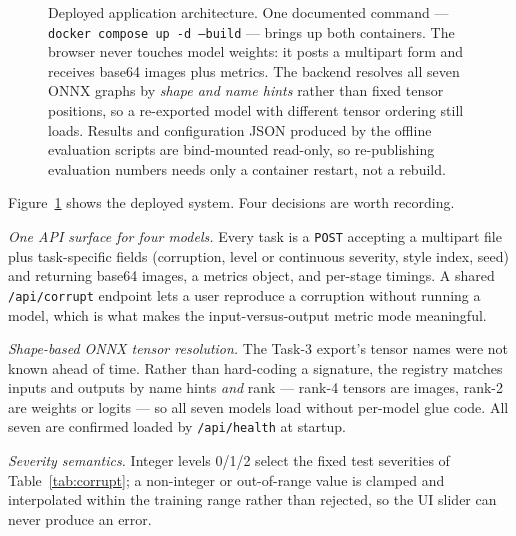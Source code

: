 \documentclass[journal]{IEEEtran}
\begin{document}
\begin{figure}[t]
\caption{Deployed application architecture. One documented command --- \texttt{docker compose up -d --build} --- brings up both containers. The browser never touches model weights: it posts a multipart form and receives base64 images plus metrics. The backend resolves all seven ONNX graphs by \emph{shape and name hints} rather than fixed tensor positions, so a re-exported model with different tensor ordering still loads. Results and configuration JSON produced by the offline evaluation scripts are bind-mounted read-only, so re-publishing evaluation numbers needs only a container restart, not a rebuild.}
\label{fig:apparch}
\end{figure}

Figure~\ref{fig:apparch} shows the deployed system. Four decisions are worth recording.

\emph{One API surface for four models.} Every task is a \texttt{POST} accepting a multipart file plus task-specific fields (corruption, level or continuous severity, style index, seed) and returning base64 images, a metrics object, and per-stage timings. A shared \texttt{/api/corrupt} endpoint lets a user reproduce a corruption without running a model, which is what makes the input-versus-output metric mode meaningful.

\emph{Shape-based ONNX tensor resolution.} The Task-3 export's tensor names were not known ahead of time. Rather than hard-coding a signature, the registry matches inputs and outputs by name hints \emph{and} rank --- rank-4 tensors are images, rank-2 are weights or logits --- so all seven models load without per-model glue code. All seven are confirmed loaded by \texttt{/api/health} at startup.

\emph{Severity semantics.} Integer levels 0/1/2 select the fixed test severities of Table~\ref{tab:corrupt}; a non-integer or out-of-range value is clamped and interpolated within the training range rather than rejected, so the UI slider can never produce an error.
\end{document}
